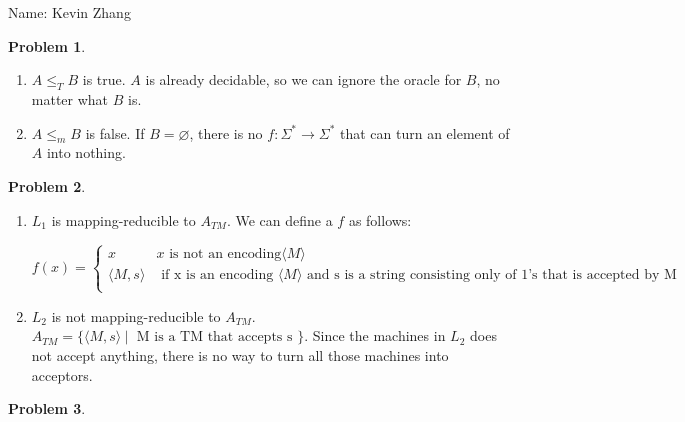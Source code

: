 \documentclass[11pt]{article}
\newcommand{\yourname}{Kevin Zhang}
\newcommand{\pipe}{\hspace{3pt}|\hspace{3pt}}
\theoremstyle{definition}
\theoremstyle{case}
\theoremstyle{theorem}
\newtheorem{prob}{Problem}
\begin{document}
{\large
\noindent Name: \yourname}

\vspace{15pt}

\begin{prob}\end{prob}

\begin{enumerate}[label=(\alph*)]

\item

$A \leq_T B$ is true. $A$ is already decidable, so we can ignore the oracle for $B$, no matter what $B$ is.

\item

$A \leq_m B$ is false. If $B = \varnothing$, there is no $f: \Sigma^* \rightarrow \Sigma^*$ that
can turn an element of $A$ into nothing.

\end{enumerate}

\begin{prob}\end{prob}

\begin{enumerate}[label=(\alph*)]

\item

$L_1$ is mapping-reducible to $A_{TM}$. We can define a $f$ as follows: 

\[ f(x) = \begin{cases}

    x & x \text{ is not an encoding} \langle M \rangle \\

    \langle M, s \rangle & \text{ if x is an encoding } \langle M \rangle \text{ and s is a string consisting only of 1's that is accepted by M} \\

    \end{cases}
\]

\item

$L_2$ is not mapping-reducible to $A_{TM}$. $A_{TM} = \{ \langle M, s  \rangle \pipe \text{ M is a TM that accepts s } \}$. 
Since the machines in $L_2$ does not accept anything, there is no way to turn all those machines into acceptors.

\end{enumerate}

\begin{prob}\end{prob}
\end{document}
